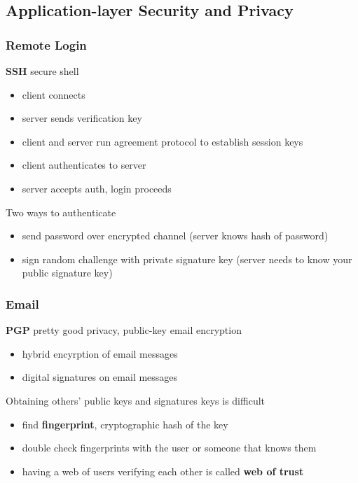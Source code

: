 \documentclass[]{article}
\theoremstyle{definition}
\begin{document}
	\subsection{Application-layer Security and Privacy}
	\subsubsection{Remote Login}
	\textbf{SSH} secure shell
	\begin{itemize}
		\item client connects
		\item server sends verification key
		\item client and server run agreement protocol to establish session keys
		\item client authenticates to server
		\item server accepts auth, login proceeds 
	\end{itemize}
	Two ways to authenticate
	\begin{itemize}
		\item send password over encrypted channel (server knows hash of password)
		\item sign random challenge with private signature key (server needs to know your public signature key)
	\end{itemize}

	\subsubsection{Email}
	\textbf{PGP} pretty good privacy, public-key email encryption
	\begin{itemize}
		\item hybrid encyrption of email messages 
		\item digital signatures on email messages
	\end{itemize}
	Obtaining others' public keys and signatures keys is difficult
	\begin{itemize}
		\item find \textbf{fingerprint}, cryptographic hash of the key
		\item double check fingerprints with the user or someone that knows them
		\item having a web of users verifying each other is called \textbf{web of trust}
	\end{itemize}
\end{document}
